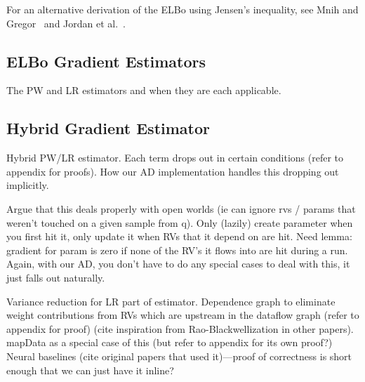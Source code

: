 For an alternative derivation of the ELBo using Jensen's inequality, see Mnih and Gregor~\cite{NVIL} and Jordan et al.~\cite{VariationalInference}.

\subsection{ELBo Gradient Estimators}

The PW and LR estimators and when they are each applicable.

\subsection{Hybrid Gradient Estimator}

Hybrid PW/LR estimator. Each term drops out in certain conditions (refer to appendix for proofs). How our AD implementation handles this dropping out implicitly.

Argue that this deals properly with open worlds (ie can ignore rvs / params that weren’t touched on a given sample from q). Only (lazily) create parameter when you first hit it, only update it when RVs that it depend on are hit. Need lemma: gradient for param is zero if none of the RV’s it flows into are hit during a run. Again, with our AD, you don’t have to do any special cases to deal with this, it just falls out naturally.

Variance reduction for LR part of estimator. Dependence graph to eliminate weight contributions from RVs which are upstream in the dataflow graph (refer to appendix for proof) (cite inspiration from Rao-Blackwellization in other papers). mapData as a special case of this (but refer to appendix for its own proof?) Neural baselines (cite original papers that used it)---proof of correctness is short enough that we can just have it inline?

